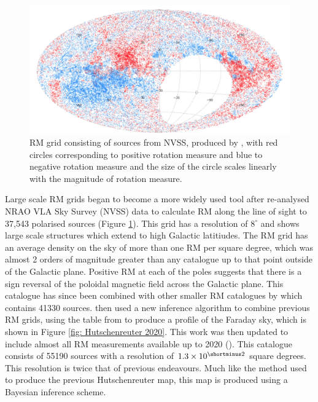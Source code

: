 \begin{figure}
    \centering
    \includegraphics[width=\linewidth]{Thesis_Template/Figures/NVSS_RM_Grid.png}
    \caption[Rotation Measure grid showing sources from NVSS]{RM grid consisting of sources from NVSS, produced by \cite{Taylor_20009}, with red circles corresponding to positive rotation measure and blue to negative rotation measure and the size of the circle scales linearly with the magnitude of rotation measure.}
    \label{fig:Taylor RM grid}
\end{figure}

Large scale RM grids began to become a more widely used tool after \cite{Taylor_20009} re-analysed NRAO VLA Sky Survey (NVSS) data to calculate RM along the line of sight to 37,543 polarised sources (Figure \ref{fig:Taylor RM grid}). This grid has a resolution of $8^\circ$ and shows large scale structures which extend to high Galactic latitiudes. The RM grid has an average density on the sky of more than one RM per square degree, which was almost 2 orders of magnitude greater than any catalogue up to that point outside of the Galactic plane. Positive RM at each of the poles suggests that there is a sign reversal of the poloidal magnetic field across the Galactic plane. This catalogue has since been combined with other smaller RM catalogues by \cite{Oppermann_2012} which contains 41330 sources. \cite{Hutschenreuter_2020} then used a new inference algorithm to combine previous RM grids, using the table from \cite{van_eck_2022_6702843} to produce a profile of the Faraday sky, which is shown in Figure \ref{fig: Hutschenreuter 2020}.  This work was then updated to include almost all RM measurements available up to 2020 (\cite{Hutschenreuter_2022}). This catalogue 
consists of 55190 sources with a resolution of $1.3 
\times 10^{\shortminus2}$ square degrees. 
This resolution is twice that of previous endeavours. 
Much like the method used to produce the previous Hutschenreuter map, this map is produced using a Bayesian inference scheme. 

